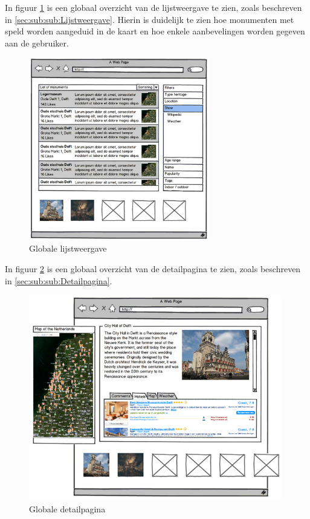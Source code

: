 \documentclass[a4paper,10pt]{article}
\begin{document}
		In figuur \ref{interface2} is een globaal overzicht van de lijstweergave te zien, zoals beschreven in \ref{sec:sub:sub:Lijstweergave}. Hierin is duidelijk te zien hoe monumenten met speld worden aangeduid in de kaart en hoe enkele aanbevelingen worden gegeven aan de gebruiker.
			\begin{figure}[ht!]
				\centering
				\includegraphics[height=8cm]{interface2.png}
				\caption{Globale lijstweergave \label{interface2}}
			\end{figure}
			In figuur \ref{interface3} is een globaal overzicht van de detailpagina te zien, zoals beschreven in \ref{sec:sub:sub:Detailpagina}.
			\begin{figure}[ht!]
				\centering
				\includegraphics[height=9cm]{interface3.png}
				\caption{Globale detailpagina \label{interface3}}
			\end{figure}
	
	\clearpage

	\printglossary
\end{document}
